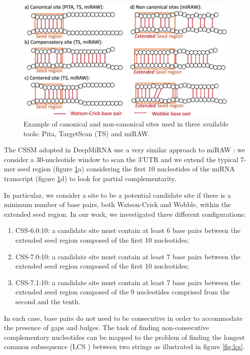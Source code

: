 \begin{figure}[hbt!]
	\centering
	\includegraphics[width=1\textwidth]{Figures/canonical}
	\caption{ Example of canonical and non-canonical sites used in three available tools: Pita, TargetScan (TS) and miRAW.}
	\label{fig:canonical}
\end{figure}

The CSSM adopted in DeepMiRNA use a very similar approach to miRAW \cite{miraw}: we consider a 30-nucleotide window to scan the 3'UTR and we extend the typical 7-mer seed region (figure \ref{fig:canonical}a) considering the first 10 nucleotides of the miRNA transcript (figure \ref{fig:canonical}d) to look for partial complementarity.

In particular, we consider a site to be a potential candidate site if there is a minimum number of base pairs, both Watson-Crick and Wobble, within the extended seed region. In our work, we investigated three different configurations: 

\begin{enumerate}
	\item CSS-6.0:10: a candidate site must contain at least 6 base pairs between the extended seed region composed of the first 10 nucleotides;
	\item CSS-7.0:10: a candidate site must contain at least 7 base pairs between the extended seed region composed of the first 10 nucleotides;
	\item CSS-7.1:10: a candidate site must contain at least 7 base pairs between the extended seed region composed of the 9 nucleotides comprised from the second and the tenth. 
	
\end{enumerate}

In each case, base pairs do not need to be consecutive in order to accommodate the presence of gaps and bulges. The task of finding non-consecutive complementary nucleotides can be mapped to the problem of finding the longest common subsequence (LCS ) between two strings as illustrated in figure \ref{fig:lcs}.

